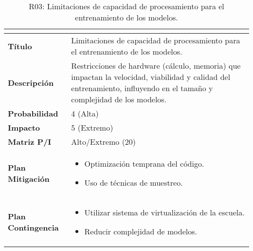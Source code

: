 \begin{table}[H]
\centering
\begin{tabular}{|>{\bfseries}l|p{10cm}|}
\hline
\rowcolor{lightgray}
\multicolumn{2}{|c|}{\textbf{Riesgo R03}} \\ \hline
Título & Limitaciones de capacidad de procesamiento para el entrenamiento de los modelos. \\ \hline
Descripción & Restricciones de hardware (cálculo, memoria) que impactan la velocidad, viabilidad y calidad del entrenamiento, influyendo en el tamaño y complejidad de los modelos.\\ \hline
Probabilidad & 4 (Alta)   \cellcolor{orangerisk}\\ \hline
Impacto & 5 (Extremo)  \cellcolor{redrisk}\\ \hline
Matriz P/I & Alto/Extremo (20)\\ \hline
Plan Mitigación & 
\begin{itemize}
\item Optimización temprana del código.
\item Uso de técnicas de muestreo.
\end{itemize} \\ \hline
Plan Contingencia & 
\begin{itemize}
\item Utilizar sistema de virtualización de la escuela.
\item Reducir complejidad de modelos.
\end{itemize} \\ \hline
\end{tabular}
\caption{R03: Limitaciones de capacidad de procesamiento para el entrenamiento de los modelos.}
\label{tab:R03}
\end{table}

